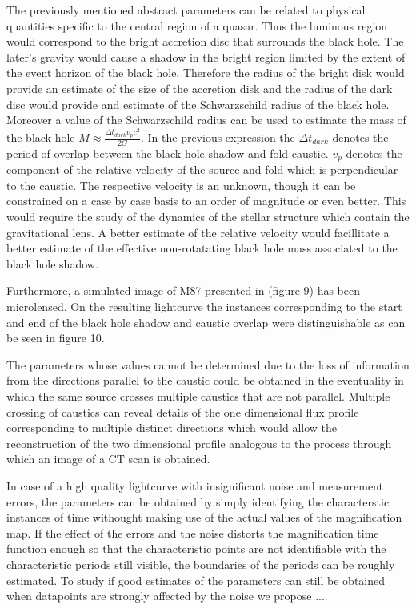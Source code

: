 The previously mentioned abstract parameters can be related to physical quantities specific to the central region of a quasar. Thus the luminous region would correspond to the bright accretion disc that surrounds the black hole. The later's gravity would cause a shadow in the bright region limited by the extent of the event horizon of the black hole. Therefore the radius of the bright disk would provide an estimate of the size of the accretion disk and the radius of the dark disc would provide and estimate of the Schwarzschild radius of the black hole. Moreover a value of the Schwarzschild radius 
can be used to estimate the mass of the black hole $M \approx \frac{\Delta t_{dark}  v_p c^2}{2G}$. In the previous 
expression the $\Delta t_{dark}$ denotes the period of overlap between the black hole shadow and fold caustic. 
$v_p$ denotes the component of the relative velocity of the source and fold which is perpendicular to the caustic.  
The respective velocity is an unknown, though it can be constrained on a case by case basis to an order of magnitude or even better. This would require the 
study of the dynamics of the stellar structure which contain the gravitational lens. A better estimate of the relative velocity would facillitate a better estimate of the effective non-rotatating black hole mass associated to the black hole shadow.  


Furthermore, a simulated image of M87 presented in \citep{2012MNRAS.421.1517D} (figure 9) has been microlensed. On the resulting lightcurve the instances corresponding to the start and end of the black hole shadow and caustic overlap were distinguishable as can be seen in figure 10.
    
The parameters whose values cannot be determined due to the loss of information from the directions parallel to the 
caustic could be obtained in the eventuality in which the same source crosses multiple caustics that are not parallel. 
Multiple crossing of caustics can reveal details of the one dimensional flux profile corresponding to multiple distinct 
directions which would allow the reconstruction of the two dimensional profile analogous to the process through which an image of a CT scan is obtained.  

In case of a high quality lightcurve with insignificant noise and measurement errors, the parameters can be obtained 
by simply identifying the characterstic instances of time withought making use of the actual values of the magnification
 map. If the effect of the errors and the noise distorts the magnification time function enough so that the 
characteristic points are not identifiable with the characteristic periods still visible, the boundaries of the periods 
can be roughly estimated. To study if good estimates of the parameters can still be obtained when datapoints are
 strongly affected by the noise we propose ....        



